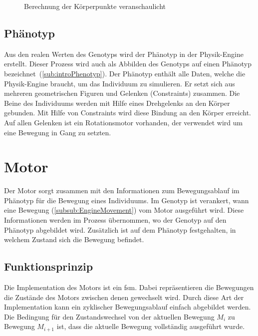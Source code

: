         \begin{figure}[H]
          \centering
          
          \caption{Berechnung der Körperpunkte veranschaulicht\label{fig:kp}}
        \end{figure}

    \subsection{Phänotyp\label{sub:Phenotyp}}

      Aus den realen Werten des Genotyps wird der Phänotyp in der Physik-Engine erstellt.
      Dieser Prozess wird auch als Abbilden des Genotyps auf einen Phänotyp bezeichnet~(\vref{sub:introPhenotyp}).
      Der Phänotyp enthält alle Daten, welche die Physik-Engine braucht, um das Individuum zu simulieren.
      Er setzt sich aus mehreren geometrischen Figuren und Gelenken (\Glspl{Constraint}) zusammen.
      Die Beine des Individuums werden mit Hilfe eines Drehgelenks an den Körper gebunden.
      Mit Hilfe von Constraints wird diese Bindung an den Körper erreicht.
      Auf allen Gelenken ist ein Rotationsmotor vorhanden, der verwendet wird um eine Bewegung in Gang zu setzten.

  \section{Motor\label{sec:Engine}}

    Der Motor sorgt zusammen mit den Informationen zum Bewegungsablauf im Phänotyp für die Bewegung eines Individuums.
    Im Genotyp ist verankert, wann eine Bewegung (\vref{subsub:EngineMovement}) vom Motor ausgeführt wird.
    Diese Informationen werden im Prozess übernommen, wo der Genotyp auf den Phänotyp abgebildet wird.
    Zusätzlich ist auf dem Phänotyp festgehalten, in welchem Zustand sich die Bewegung befindet.

    \subsection{Funktionsprinzip}

      Die Implementation des Motors ist ein \acrfull{fsm}.
      Dabei repräsentieren die Bewegungen die Zustände des Motors zwischen denen gewechselt wird.
      Durch diese Art der Implementation kann ein zyklischer Bewegungsablauf einfach abgebildet werden.
      Die Bedingung für den Zustandswechsel von der aktuellen Bewegung \( M_{i} \) zu Bewegung \( M_{i + 1} \) ist,
      dass die aktuelle Bewegung vollständig ausgeführt wurde.

